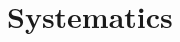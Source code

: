 \documentclass[twocolumn]{./aastex63}
\begin{document}
\section{Systematics}\label{sec:systematics}






\end{document}
